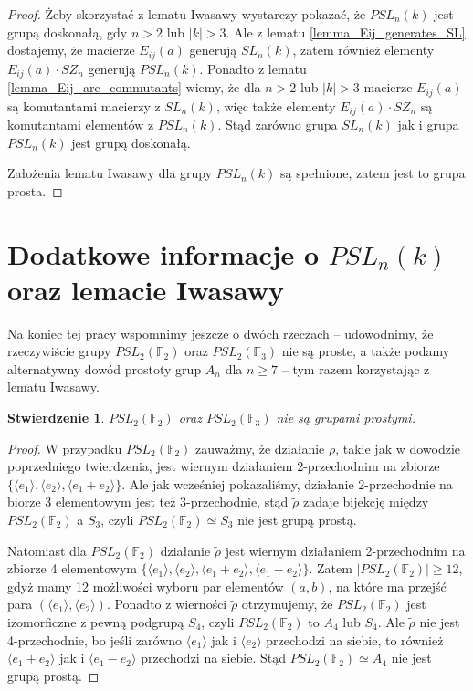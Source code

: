 \documentclass[licencjacka]{pracamgr}
\newtheorem{fact}{Stwierdzenie}[section]
\begin{document}
\begin{proof}
  Żeby skorzystać z lematu Iwasawy wystarczy pokazać, że $PSL_n(k)$ jest grupą doskonałą, 
  gdy $n > 2$ lub $|k| > 3$.
  Ale z lematu \ref{lemma_Eij_generates_SL} dostajemy, że macierze $E_{i j}(a)$ generują $SL_n(k)$,
  zatem również elementy $E_{i j}(a) \cdot SZ_n$ generują $PSL_n(k)$.
  Ponadto z lematu \ref{lemma_Eij_are_commutants} wiemy, że dla $n > 2$ lub $|k| > 3$ macierze $E_{i j}(a)$ 
  są komutantami macierzy z $SL_n(k)$, więc także elementy $E_{i j}(a) \cdot SZ_n$ są komutantami elementów z $PSL_n(k)$.
  Stąd zarówno grupa $SL_n(k)$ jak i grupa $PSL_n(k)$ jest grupą doskonałą.
  
  Założenia lematu Iwasawy dla grupy $PSL_n(k)$ są spełnione, zatem jest to grupa prosta.
\end{proof}

\section{Dodatkowe informacje o $PSL_n(k)$ oraz lemacie Iwasawy}

Na koniec tej pracy wspomnimy jeszcze o dwóch rzeczach -- udowodnimy, że rzeczywiście 
grupy $PSL_2(\mathbb{F}_2)$ oraz $PSL_2(\mathbb{F}_3)$ nie są proste,
a także podamy alternatywny dowód prostoty grup $A_n$ dla $n \ge 7$ -- tym razem korzystając z lematu Iwasawy.

\begin{fact}
  $PSL_2(\mathbb{F}_2)$ oraz $PSL_2(\mathbb{F}_3)$ nie są grupami prostymi.
\end{fact}
\begin{proof}
  W przypadku $PSL_2(\mathbb{F}_2)$ zauważmy, że działanie $\tilde{\rho}$, takie jak w dowodzie poprzedniego twierdzenia,
  jest wiernym działaniem 2-przechodnim na zbiorze  $\{ \langle e_1 \rangle, \langle e_2 \rangle, \langle e_1 + e_2 \rangle\}$.
  Ale jak wcześniej pokazaliśmy, działanie 2-przechodnie na biorze 3 elementowym jest też 3-przechodnie, 
  stąd $\tilde{\rho}$ zadaje bijekcję między $PSL_2(\mathbb{F}_2)$ a $S_3$, 
  czyli $PSL_2(\mathbb{F}_2) \simeq S_3$ nie jest grupą prostą.

  Natomiast dla $PSL_2(\mathbb{F}_2)$ działanie $\tilde{\rho}$
  jest wiernym działaniem 2-przechodnim na zbiorze 4 elementowym
  $\{ \langle e_1 \rangle, \langle e_2 \rangle, \langle e_1 + e_2 \rangle, \langle e_1 - e_2 \rangle \}$.
  Zatem $| PSL_2(\mathbb{F}_2) | \ge 12$, gdyż mamy 12 możliwości wyboru par elementów $(a, b)$, 
  na które ma przejść para $(\langle e_1 \rangle, \langle e_2 \rangle)$.
  Ponadto z wierności $\tilde{\rho}$ otrzymujemy, że $PSL_2(\mathbb{F}_2)$ jest izomorficzne z pewną podgrupą $S_4$,
  czyli $PSL_2(\mathbb{F}_2)$ to $A_4$ lub $S_4$.
  Ale $\tilde{\rho}$ nie jest 4-przechodnie, bo jeśli zarówno $\langle e_1 \rangle$ jak i $\langle e_2 \rangle$ przechodzi na siebie,
  to również $\langle e_1 + e_2 \rangle$ jak i $\langle e_1 - e_2 \rangle$ przechodzi na siebie.
  Stąd $PSL_2(\mathbb{F}_2) \simeq A_4$ nie jest grupą prostą.
\end{proof}
\end{document}

